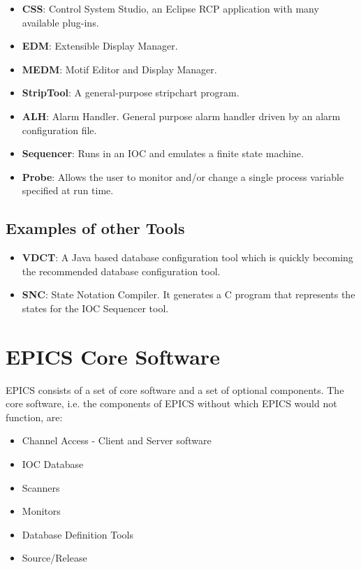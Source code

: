 \begin{itemize}
\item \textbf{CSS}: Control System Studio, an Eclipse RCP application with many available plug-ins.

\item \textbf{EDM}: Extensible Display Manager.

\item \textbf{MEDM}: Motif Editor and Display Manager.

\item \textbf{StripTool}: A general-purpose stripchart program.

\item \textbf{ALH}: Alarm Handler. General purpose alarm handler driven by an alarm configuration file.

\item \textbf{Sequencer}:  Runs in an IOC and emulates a finite state machine.

\item \textbf{Probe}: Allows the user to monitor and/or change a single process variable specified at run time.
\end{itemize}

\subsection{Examples of other Tools}

\begin{itemize}
\item \textbf{VDCT}: A Java based database configuration tool which is quickly becoming the recommended database 
configuration tool.

\item \textbf{SNC}:  State Notation Compiler. It generates a C program that represents the states for the IOC Sequencer tool.
\end{itemize}

\section{EPICS Core Software}

EPICS consists of a set of core software and a set of optional components. The core software, i.e. the components of 
EPICS without which EPICS would not function, are:

\begin{itemize}
\item Channel Access - Client and Server software

\item IOC Database

\item Scanners

\item Monitors

\item Database Definition Tools

\item Source/Release
\end{itemize}


